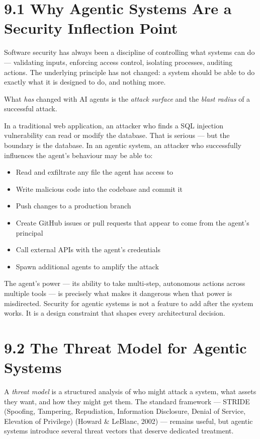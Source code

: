 \documentclass[11pt,a4paper]{book}
\begin{document}
\medskip

\section{9.1 Why Agentic Systems Are a Security Inflection Point}

Software security has always been a discipline of controlling what systems can do --- validating inputs, enforcing access control, isolating processes, auditing actions. The underlying principle has not changed: a system should be able to do exactly what it is designed to do, and nothing more.

What \textit{has} changed with AI agents is the \textit{attack surface} and the \textit{blast radius} of a successful attack.

In a traditional web application, an attacker who finds a SQL injection vulnerability can read or modify the database. That is serious --- but the boundary is the database. In an agentic system, an attacker who successfully influences the agent's behaviour may be able to:

\begin{itemize}
  \item Read and exfiltrate any file the agent has access to
  \item Write malicious code into the codebase and commit it
  \item Push changes to a production branch
  \item Create GitHub issues or pull requests that appear to come from the agent's principal
  \item Call external APIs with the agent's credentials
  \item Spawn additional agents to amplify the attack
\end{itemize}

The agent's power --- its ability to take multi-step, autonomous actions across multiple tools --- is precisely what makes it dangerous when that power is misdirected. Security for agentic systems is not a feature to add after the system works. It is a design constraint that shapes every architectural decision.

\medskip

\section{9.2 The Threat Model for Agentic Systems}

A \textit{threat model} is a structured analysis of who might attack a system, what assets they want, and how they might get them. The standard framework --- STRIDE (Spoofing, Tampering, Repudiation, Information Disclosure, Denial of Service, Elevation of Privilege) (Howard \& LeBlanc, 2002) --- remains useful, but agentic systems introduce several threat vectors that deserve dedicated treatment.
\end{document}
